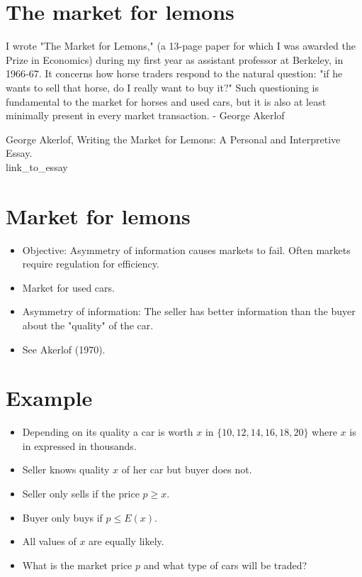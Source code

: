 \documentclass[10pt]{article}
\begin{document}
\section*{The market for lemons}
I wrote "The Market for Lemons," (a 13-page paper for which I was awarded the Prize in Economics) during my first year as assistant professor at Berkeley, in 1966-67. It concerns how horse traders respond to the natural question: "if he wants to sell that horse, do I really want to buy it?" Such questioning is fundamental to the market for horses and used cars, but it is also at least minimally present in every market transaction. - George Akerlof

George Akerlof, Writing the Market for Lemons: A Personal and Interpretive Essay.\\
link\_to\_essay

\section*{Market for lemons}
\begin{itemize}
  \item Objective: Asymmetry of information causes markets to fail. Often markets require regulation for efficiency.
  \item Market for used cars.
  \item Asymmetry of information: The seller has better information than the buyer about the "quality" of the car.
  \item See Akerlof (1970).
\end{itemize}

\section*{Example}
\begin{itemize}
  \item Depending on its quality a car is worth $x$ in $\{10,12,14,16,18,20\}$ where $x$ is in expressed in thousands.
  \item Seller knows quality $x$ of her car but buyer does not.
  \item Seller only sells if the price $p \geq x$.
  \item Buyer only buys if $p \leq E(x)$.
  \item All values of $x$ are equally likely.
  \item What is the market price $p$ and what type of cars will be traded?
\end{itemize}
\end{document}

